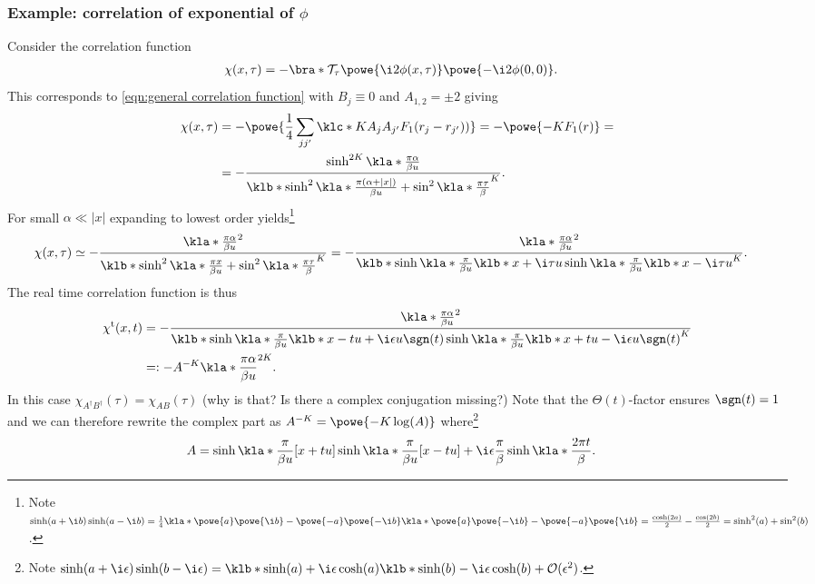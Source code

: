 \documentclass[english, parskip=full]{scrartcl}
\renewcommand{\t}{\text{t}}
\newcommand{\TODO}[1]{\color{red!60!black} #1\color{black}}
\begin{document}
\subsubsection{Example: correlation of exponential of $\phi$}
Consider the correlation function
\begin{align}
\chi(x,\tau) &= -\bra*{\mathcal{T}_\tau \powe{\i 2\phi(x,\tau)} \powe{-\i 2\phi(0,0)} }.
\end{align}
This corresponds to \autoref{eqn:general correlation function} with $B_j\equiv 0$ and $A_{1,2} = \pm 2$ giving
\begin{align}
\chi(x,\tau) &= -\powe{\frac{1}{4} \sum_{jj'} \klc*{KA_jA_{j'} F_1(r_j - r_{j'}) )}  } = -\powe{-K F_1(r)} = \\
&= -\frac{\sinh^{2K} \kla*{\frac{\pi\alpha}{\beta u}} }{\klb*{\sinh^2\kla*{\frac{\pi (\alpha + |x|)}{\beta u}} + \sin^2\kla*{\frac{\pi\tau}{\beta}} }^K}.
\end{align}
For small $\alpha \ll |x|$ expanding to lowest order yields\footnote{Note $\sinh(a+\i b) \sinh(a-\i b) = \frac{1}{4} \kla*{\powe{a}\powe{\i b} - \powe{-a} \powe{-\i b}} \kla*{\powe{a} \powe{-\i b} - \powe{-a} \powe{\i b}} = \frac{\cosh (2a)}{2}  - \frac{\cos (2b)}{2} = \sinh^2 (a) + \sin^2(b)$.}
\begin{align}
\chi(x,\tau) &\simeq - \frac{\kla*{\frac{\pi\alpha}{\beta u}}^2}{\klb*{ \sinh^2\kla*{\frac{\pi x}{\beta u}} + \sin^2 \kla*{\frac{\pi\tau}{\beta}} }^K} = -\frac{\kla*{\frac{\pi\alpha}{\beta u}}^2}{\klb*{ \sinh\kla*{\frac{\pi}{\beta u} \klb*{x + \i\tau u} } \sinh\kla*{\frac{\pi}{\beta u} \klb*{x - \i\tau u} } }^K}.
\end{align}
The real time correlation function is thus
\begin{align}
\chi^\t(x,t) &= -\frac{\kla*{\frac{\pi\alpha}{\beta u}}^2}{\klb*{ \sinh\kla*{\frac{\pi}{\beta u} \klb*{x - tu + \i\epsilon u\sgn (t)} } \sinh\kla*{\frac{\pi}{\beta u} \klb*{x + tu - \i\epsilon u\sgn (t)} } }^K} \\
&=: -A^{-K} \kla*{\frac{\pi\alpha}{\beta u}}^{2K}.
\end{align}
\TODO{In this case $\chi_{A^\dagger B^\dagger}(\tau) = \chi_{AB}(\tau)$ (why is that? Is there a complex conjugation missing?)}
Note that the $\Theta(t)$-factor ensures $\sgn(t) = 1$ and we can therefore rewrite the complex part as $A^{-K} = \powe{-K\log (A)}$ where\footnote{Note $\sinh(a + \i\epsilon) \sinh(b - \i\epsilon) = \klb*{\sinh(a) + \i\epsilon \cosh (a)} \klb*{\sinh(b) - \i\epsilon \cosh(b)} + \mathcal{O}(\epsilon^2)$.}
\begin{align}
A &= \sinh\kla*{\frac{\pi}{\beta u} [x+tu]} \sinh\kla*{\frac{\pi}{\beta u}[x-tu]} + \i\epsilon \frac{\pi}{\beta} \sinh \kla*{\frac{2\pi t}{\beta}}. 
\end{align}
\end{document}
